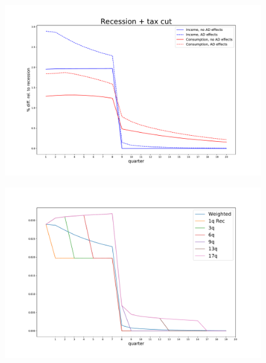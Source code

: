 \documentclass[]{article}
\begin{document}
\begin{figure}
	\centering
	\includegraphics[width=\linewidth]{../Full_Run_Mar5/recession_taxcut_relrecession}
	\caption{}
	\label{fig:recessiontaxcutrelrecession_statedep}
\end{figure}

\begin{figure}
	\centering
	\includegraphics[width=\linewidth]{../Full_Run_Mar5/Tax_Cut_Rec_Decomp_Rel_Recession}
	\caption{}
	\label{fig:taxcutrecdecomprelrecession}
\end{figure}
\end{document}
